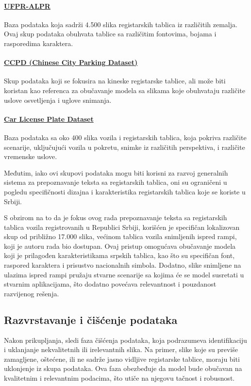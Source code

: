 \documentclass[a4paper,12pt]{article}
\begin{document}
	\paragraph{\href{https://github.com/raysonlaroca/ufpr-alpr-dataset}{UFPR-ALPR}} \cite{UFPRALPRDataset}
	Baza podataka koja sadrži 4.500 slika registarskih tablica iz različitih zemalja. Ovaj skup podataka obuhvata tablice sa različitim fontovima, bojama i rasporedima karaktera.
	
	\paragraph{\href{https://github.com/detectRecog/CCPD}{CCPD (Chinese City Parking Dataset)}} \cite{CCPD}
	Skup podataka koji se fokusira na kineske registarske tablice, ali može biti koristan kao referenca za obučavanje modela sa slikama koje obuhvataju različite uslove osvetljenja i uglove snimanja.
	
	\paragraph{\href{https://datasetninja.com/car-license-plate}{Car License Plate Dataset}} \cite{DatasetNinja}
	Baza podataka sa oko 400 slika vozila i registarskih tablica, koja pokriva različite scenarije, uključujući vozila u pokretu, snimke iz različitih perspektiva, i različite vremenske uslove. \newline
	
	Međutim, iako ovi skupovi podataka mogu biti korisni za razvoj generalnih sistema za prepoznavanje teksta sa registarskih tablica, oni su ograničeni u pogledu specifičnosti dizajna i karakteristika registarskih tablica koje se koriste u Srbiji.
	
	S obzirom na to da je fokus ovog rada prepoznavanje teksta sa registarskih tablica vozila registrovanih u Republici Srbiji, korišćen je specifičan lokalizovan skup od približno 17.000 slika, većinom tablica vozila snimljenih ispred rampi, koji je autoru rada bio dostupan. Ovaj pristup omogućava obučavanje modela koji je prilagođen karakteristikama srpskih tablica, kao što su specifičan font, raspored karaktera i prisustvo nacionalnih simbola. Dodatno, slike snimljene na ulazima ispred rampi pružaju stvarne scenarije sa kojima će se model susretati u stvarnim aplikacijama, što dodatno povećava relevantnost i pouzdanost razvijenog rešenja.
	
	\subsection{Razvrstavanje i čišćenje podataka}
	Nakon prikupljanja, sledi faza čišćenja podataka, koja podrazumeva identifikaciju i uklanjanje nekvalitetnih ili irelevantnih slika. Na primer, slike koje su previše zamagljene, oštećene, ili ne sadrže jasno vidljive registarske tablice, moraju biti uklonjenje iz skupa podataka. Ova faza obezbeđuje da model bude obučavan na kvalitetnim i relevantnim podacima, što utiče na njegovu tačnost i robusnost.
	
\end{document}
